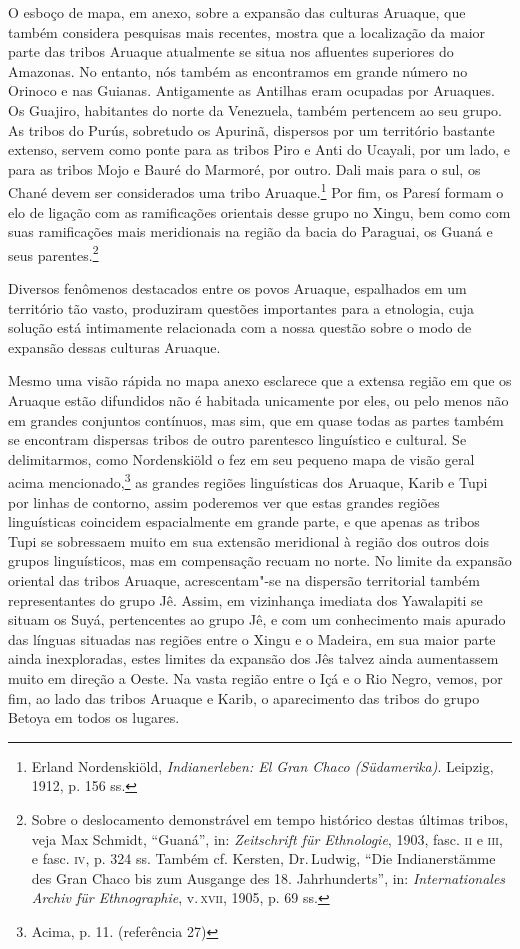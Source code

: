 O esboço de mapa, em anexo, sobre a expansão das culturas Aruaque, que
também considera pesquisas mais recentes, mostra que a localização da
maior parte das tribos Aruaque atualmente se situa nos afluentes
superiores do Amazonas. No entanto, nós também as encontramos em grande
número no Orinoco e nas Guianas. Antigamente as Antilhas eram ocupadas
por Aruaques. Os Guajiro, habitantes do norte da Venezuela, também
pertencem ao seu grupo. As tribos do Purús, sobretudo os Apurinã,
dispersos por um território bastante extenso, servem como ponte para as
tribos Piro e Anti do Ucayali, por um lado, e para as tribos Mojo e
Bauré do Marmoré, por outro. Dali mais para o sul, os Chané devem ser
considerados uma tribo Aruaque.\footnote{Erland Nordenskiöld,
  \emph{Indianerleben: El Gran Chaco (Südamerika)}. Leipzig, 1912, p.
  156 ss.} Por fim, os Paresí formam o elo de ligação com as
ramificações orientais desse grupo no Xingu, bem como com suas
ramificações mais meridionais na região da bacia do Paraguai, os Guaná e
seus parentes.\footnote{Sobre o deslocamento demonstrável em tempo
  histórico destas últimas tribos, veja Max Schmidt, ``Guaná'', in:
  \emph{Zeitschrift für Ethnologie}, 1903, fasc. \textsc{ii} e \textsc{iii}, e fasc. \textsc{iv},
  p. 324 ss. Também cf. Kersten, Dr.\,Ludwig, ``Die Indianerstämme des
  Gran Chaco bis zum Ausgange des 18. Jahrhunderts'', in:
  \emph{Internationales Archiv für Ethnographie}, v.\,\textsc{xvii}, 1905, p. 69
  ss.}

Diversos fenômenos destacados entre os povos Aruaque, espalhados em um
território tão vasto, produziram questões importantes para a etnologia,
cuja solução está intimamente relacionada com a nossa questão sobre o
modo de expansão dessas culturas Aruaque.

Mesmo uma visão rápida no mapa anexo esclarece que a extensa região em
que os Aruaque estão difundidos não é habitada unicamente por eles, ou
pelo menos não em grandes conjuntos contínuos, mas sim, que em quase
todas as partes também se encontram dispersas tribos de outro
parentesco linguístico e cultural. Se delimitarmos, como Nordenskiöld o
fez em seu pequeno mapa de visão geral acima mencionado,\footnote{Acima,
  p. 11. (referência 27)} as grandes regiões linguísticas dos Aruaque,
Karib e Tupi por linhas de contorno, assim poderemos ver que estas
grandes regiões linguísticas coincidem espacialmente em grande parte, e
que apenas as tribos Tupi se sobressaem muito em sua extensão meridional
à região dos outros dois grupos linguísticos, mas em compensação recuam
no norte. No limite da expansão oriental das tribos Aruaque,
acrescentam"-se na dispersão territorial também representantes do grupo
Jê. Assim, em vizinhança imediata dos Yawalapiti se situam os Suyá,
pertencentes ao grupo Jê, e com um conhecimento mais apurado das línguas
situadas nas regiões entre o Xingu e o Madeira, em sua maior parte ainda
inexploradas, estes limites da expansão dos Jês talvez ainda aumentassem
muito em direção a Oeste. Na vasta região entre o Içá e o Rio Negro,
vemos, por fim, ao lado das tribos Aruaque e Karib, o aparecimento das
tribos do grupo Betoya em todos os lugares.

